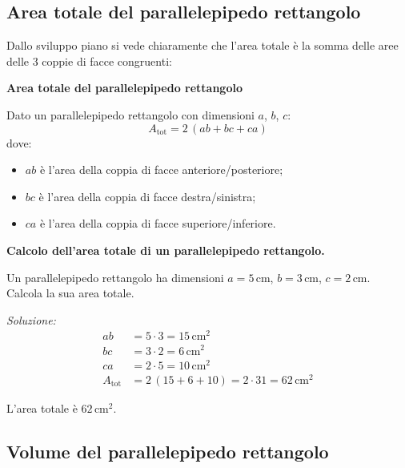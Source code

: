 \subsection{Area totale del parallelepipedo rettangolo}

Dallo sviluppo piano si vede chiaramente che l'area totale è la somma delle aree delle 3 coppie di facce congruenti:

\begin{regola}
    \textbf{Area totale del parallelepipedo rettangolo}

    Dato un parallelepipedo rettangolo con dimensioni $a$, $b$, $c$:
    \[
        A_{\text{tot}} = 2\,(ab + bc + ca)
    \]
    dove:
    \begin{itemize}[leftmargin=1.4em, nosep]
        \item $ab$ è l'area della coppia di facce anteriore/posteriore;
        \item $bc$ è l'area della coppia di facce destra/sinistra;
        \item $ca$ è l'area della coppia di facce superiore/inferiore.
    \end{itemize}
\end{regola}

\begin{esempio}
    \textbf{Calcolo dell'area totale di un parallelepipedo rettangolo.}

    Un parallelepipedo rettangolo ha dimensioni $a = 5\,\text{cm}$, $b = 3\,\text{cm}$, $c = 2\,\text{cm}$. Calcola la sua area totale.

    \medskip
    \textit{Soluzione:}
    \begin{align*}
        ab             & = 5 \cdot 3 = 15\,\text{cm}^2                     \\
        bc             & = 3 \cdot 2 = 6\,\text{cm}^2                      \\
        ca             & = 2 \cdot 5 = 10\,\text{cm}^2                     \\[4pt]
        A_{\text{tot}} & = 2\,(15 + 6 + 10) = 2 \cdot 31 = 62\,\text{cm}^2
    \end{align*}

    L'area totale è $62\,\text{cm}^2$.
\end{esempio}

\subsection{Volume del parallelepipedo rettangolo}

